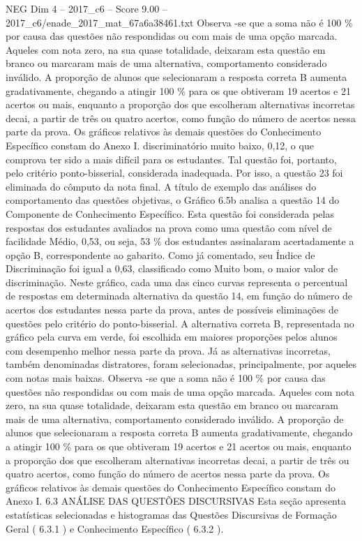 \begin{textsample}{NEG Dim 4 – 2017\_c6 – Score 9.00 – 2017\_c6/enade\_2017\_mat\_67a6a38461.txt}
Observa -se que a soma não é 100 \% por causa das questões não respondidas ou com mais de uma opção marcada.
Aqueles com nota zero, na sua quase totalidade, deixaram esta questão em branco ou marcaram mais de uma alternativa, comportamento considerado inválido.
A proporção de alunos que selecionaram a resposta correta B aumenta gradativamente, chegando a atingir 100 \% para os que obtiveram 19 acertos e 21 acertos ou mais, enquanto a proporção dos que escolheram alternativas incorretas decai, a partir de três ou quatro acertos, como função do número de acertos nessa parte da prova.
Os gráficos relativos às demais questões do Conhecimento Específico constam do Anexo I. discriminatório muito baixo, 0,12, o que comprova ter sido a mais difícil para os estudantes.
Tal questão foi, portanto, pelo critério ponto-bisserial, considerada inadequada.
Por isso, a questão 23 foi eliminada do cômputo da nota final.
A título de exemplo das análises do comportamento das questões objetivas, o Gráfico 6.5b analisa a questão 14 do Componente de Conhecimento Específico.
Esta questão foi considerada pelas respostas dos estudantes avaliados na prova como uma questão com nível de facilidade Médio, 0,53, ou seja, 53 \% dos estudantes assinalaram acertadamente a opção B, correspondente ao gabarito.
Como já comentado, seu Índice de Discriminação foi igual a 0,63, classificado como Muito bom, o maior valor de discriminação.
Neste gráfico, cada uma das cinco curvas representa o percentual de respostas em determinada alternativa da questão 14, em função do número de acertos dos estudantes nessa parte da prova, antes de possíveis eliminações de questões pelo critério do ponto-bisserial.
A alternativa correta B, representada no gráfico pela curva em verde, foi escolhida em maiores proporções pelos alunos com desempenho melhor nessa parte da prova.
Já as alternativas incorretas, também denominadas distratores, foram selecionadas, principalmente, por aqueles com notas mais baixas.
Observa -se que a soma não é 100 \% por causa das questões não respondidas ou com mais de uma opção marcada.
Aqueles com nota zero, na sua quase totalidade, deixaram esta questão em branco ou marcaram mais de uma alternativa, comportamento considerado inválido.
A proporção de alunos que selecionaram a resposta correta B aumenta gradativamente, chegando a atingir 100 \% para os que obtiveram 19 acertos e 21 acertos ou mais, enquanto a proporção dos que escolheram alternativas incorretas decai, a partir de três ou quatro acertos, como função do número de acertos nessa parte da prova.
Os gráficos relativos às demais questões do Conhecimento Específico constam do Anexo I. 6.3 ANÁLISE DAS QUESTÕES DISCURSIVAS Esta seção apresenta estatísticas selecionadas e histogramas das Questões Discursivas de Formação Geral ( 6.3.1 ) e Conhecimento Específico ( 6.3.2 ).

\end{textsample}

